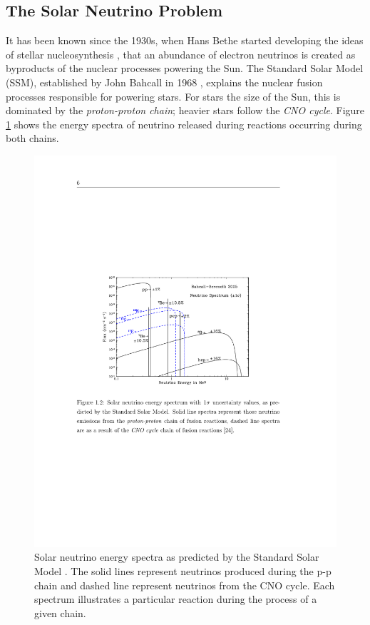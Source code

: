 \subsection{The Solar Neutrino Problem}\label{SolarNeutrinoProblem}

It has been known since the 1930s, when Hans Bethe started developing the ideas of stellar nucleosynthesis \cite{Bethe1939}, that an abundance of electron neutrinos is created as byproducts of the nuclear processes powering the Sun.  The Standard Solar Model (SSM), established by John Bahcall in 1968 \cite{Bahcall1968}, explains the nuclear fusion processes responsible for powering stars.  For stars the size of the Sun, this is dominated by the \textit{proton-proton chain}; heavier stars follow the \textit{CNO cycle}.  Figure \ref{fig:SolarNeutrinoCycles} shows the energy spectra of neutrino released during reactions occurring during both chains.

\begin{figure}
\centering
  \includegraphics[width=12cm]{SolarNeutrinoCycles.pdf}
  \caption{Solar neutrino energy spectra as predicted by the Standard Solar Model \cite{Bahcall2005}.  The solid lines represent neutrinos produced during the p-p chain and dashed line represent neutrinos from the CNO cycle.  Each spectrum illustrates a particular reaction during the process of a given chain.}
  \label{fig:SolarNeutrinoCycles}
\end{figure}

